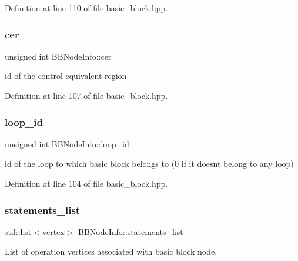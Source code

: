 Definition at line 110 of file basic\+\_\+block.\+hpp.

\mbox{\label{structBBNodeInfo_a4cd45e5f9383ffe98e751a33ae1f1633}} 
\subsubsection{\texorpdfstring{cer}{cer}}
{\footnotesize\ttfamily unsigned int B\+B\+Node\+Info\+::cer}



id of the control equivalent region 



Definition at line 107 of file basic\+\_\+block.\+hpp.

\mbox{\label{structBBNodeInfo_acbdf26d1151e519acbaaae9d5abedc94}} 
\subsubsection{\texorpdfstring{loop\+\_\+id}{loop\_id}}
{\footnotesize\ttfamily unsigned int B\+B\+Node\+Info\+::loop\+\_\+id}



id of the loop to which basic block belongs to (0 if it doesn\textquotesingle{}t belong to any loop) 



Definition at line 104 of file basic\+\_\+block.\+hpp.

\mbox{\label{structBBNodeInfo_a209fdd5fbe87c3f104221f20c81e0984}} 
\subsubsection{\texorpdfstring{statements\+\_\+list}{statements\_list}}
{\footnotesize\ttfamily std\+::list$<$\hyperlink{graph_8hpp_abefdcf0544e601805af44eca032cca14}{vertex}$>$ B\+B\+Node\+Info\+::statements\+\_\+list}



List of operation vertices associated with basic block node. 



